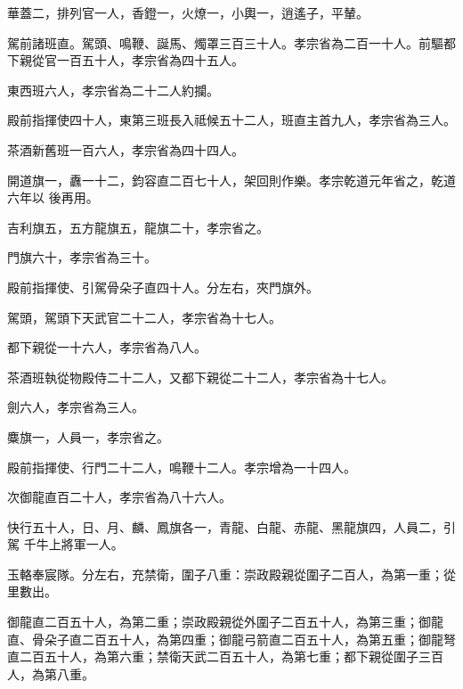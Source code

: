 \begin{pinyinscope}
 華蓋二，排列官一人，香鐙一，火燎一，小輿一，逍遙子，平輦。



 駕前諸班直。駕頭、鳴鞭、誕馬、燭罩三百三十人。孝宗省為二百一十人。前驅都下親從官一百五十人，孝宗省為四十五人。



 東西班六人，孝宗省為二十二人約攔。



 殿前指揮使四十人，東第三班長入祗候五十二人，班直主首九人，孝宗省為三人。



 茶酒新舊班一百六人，孝宗省為四十四人。



 開道旗一，纛一十二，鈞容直二百七十人，架回則作樂。孝宗乾道元年省之，乾道六年以
 後再用。



 吉利旗五，五方龍旗五，龍旗二十，孝宗省之。



 門旗六十，孝宗省為三十。



 殿前指揮使、引駕骨朵子直四十人。分左右，夾門旗外。



 駕頭，駕頭下天武官二十二人，孝宗省為十七人。



 都下親從一十六人，孝宗省為八人。



 茶酒班執從物殿侍二十二人，又都下親從二十二人，孝宗省為十七人。



 劍六人，孝宗省為三人。



 麋旗一，人員一，孝宗省之。



 殿前指揮使、行門二十二人，鳴鞭十二人。孝宗增為一十四人。



 次御龍直百二十人，孝宗省為八十六人。



 快行五十人，日、月、麟、鳳旗各一，青龍、白龍、赤龍、黑龍旗四，人員二，引駕
 千牛上將軍一人。



 玉輅奉宸隊。分左右，充禁衛，圍子八重：崇政殿親從圍子二百人，為第一重；從里數出。



 御龍直二百五十人，為第二重；崇政殿親從外圍子二百五十人，為第三重；御龍直、骨朵子直二百五十人，為第四重；御龍弓箭直二百五十人，為第五重；御龍弩直二百五十人，為第六重；禁衛天武二百五十人，為第七重；都下親從圍子三百人，為第八重。




\end{pinyinscope}
